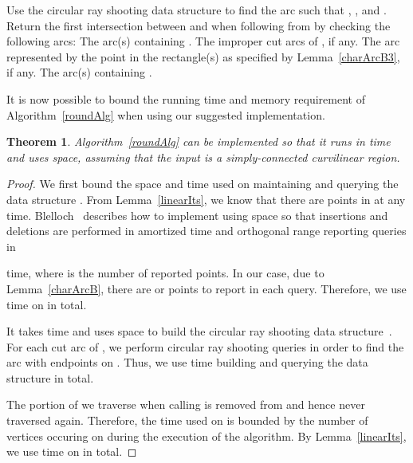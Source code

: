 \documentclass{article}
\newtheorem{theorem}{Theorem}[section]
\begin{document}
\begin{algorithm}[h]
\LinesNumbered
\DontPrintSemicolon
\SetArgSty{}
Use the circular ray shooting data structure to find the arc
 such that , , and 
.\;
Return the first intersection between  and  when following  from  by checking the following arcs:\;
\quad\quad The arc(s) containing .\;
\quad\quad The improper cut arcs of , if any.\;
\quad\quad The arc represented by the point  in the rectangle(s) as specified by Lemma~\ref{charArcB3}, if any.\;
\quad\quad The arc(s) containing .
\caption{}
\label{traverseC}
\end{algorithm}

It is now possible to bound
the running time and memory requirement
of Algorithm~\ref{roundAlg} when using our suggested implementation.

\begin{theorem}\label{finalThm}
Algorithm~\ref{roundAlg} can be implemented so that it runs in
time  and uses  space, assuming that the input is a simply-connected curvilinear region.
\end{theorem}

\begin{proof}
We first bound the space and time used on maintaining and querying the data structure
.
From Lemma~\ref{linearIts}, we know that there are  points in  at
any time. Blelloch~\cite{blelloch2008space} describes how to implement
 using  space so that insertions and deletions are performed in
 amortized time and
orthogonal range reporting queries in

time, where  is the number of reported points.
In our case, due to Lemma~\ref{charArcB}, there are  or  points
to report in each query.
Therefore, we use  time on  in total.

It takes  time and uses  space to build the circular ray shooting data structure~\cite{Cheng04}.
For each cut arc of , we perform  circular ray shooting queries in order to find the arc  with endpoints on .
Thus, we use  time building and querying the data structure in total.

The portion of  we traverse when calling
 is removed from  and hence never traversed again.
Therefore, the time used on  is bounded by the number of
vertices occuring on  during the execution of the algorithm.
By Lemma~\ref{linearIts}, we use  time on 
in total.
\end{proof}
\end{document}
